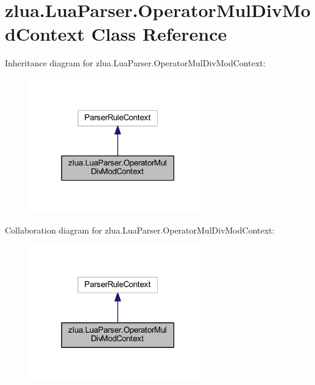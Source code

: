 \hypertarget{classzlua_1_1_lua_parser_1_1_operator_mul_div_mod_context}{}\section{zlua.\+Lua\+Parser.\+Operator\+Mul\+Div\+Mod\+Context Class Reference}
\label{classzlua_1_1_lua_parser_1_1_operator_mul_div_mod_context}


Inheritance diagram for zlua.\+Lua\+Parser.\+Operator\+Mul\+Div\+Mod\+Context\+:
\nopagebreak
\begin{figure}[H]
\begin{center}
\leavevmode
\includegraphics[width=218pt]{classzlua_1_1_lua_parser_1_1_operator_mul_div_mod_context__inherit__graph}
\end{center}
\end{figure}


Collaboration diagram for zlua.\+Lua\+Parser.\+Operator\+Mul\+Div\+Mod\+Context\+:
\nopagebreak
\begin{figure}[H]
\begin{center}
\leavevmode
\includegraphics[width=218pt]{classzlua_1_1_lua_parser_1_1_operator_mul_div_mod_context__coll__graph}
\end{center}
\end{figure}
